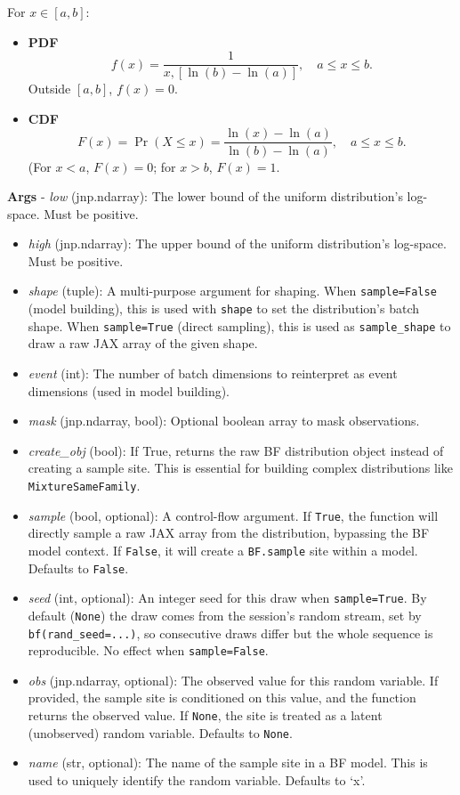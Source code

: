 \documentclass[
  letterpaper,
  DIV=11,
  numbers=noendperiod]{scrartcl}
\begin{document}
For \(x \in [a, b]\):

\begin{itemize}
\item
  \textbf{PDF} \[
  f(x) = \frac{1}{x , [\ln(b) - \ln(a)]}, \quad a \le x \le b.
  \] Outside \([a, b]\), \(f(x) = 0\).
\item
  \textbf{CDF} \[
  F(x) = \Pr(X \le x) = \frac{\ln(x) - \ln(a)}{\ln(b) - \ln(a)}, \quad a \le x \le b.
  \] (For \(x < a\), \(F(x) = 0\); for \(x > b\), \(F(x) = 1\).
\end{itemize}

\textbf{Args} - \emph{low} (jnp.ndarray): The lower bound of the uniform
distribution's log-space. Must be positive.

\begin{itemize}
\item
  \emph{high} (jnp.ndarray): The upper bound of the uniform
  distribution's log-space. Must be positive.
\item
  \emph{shape} (tuple): A multi-purpose argument for shaping. When
  \texttt{sample=False} (model building), this is used with
  \texttt{shape} to set the distribution's batch shape. When
  \texttt{sample=True} (direct sampling), this is used as
  \texttt{sample\_shape} to draw a raw JAX array of the given shape.
\item
  \emph{event} (int): The number of batch dimensions to reinterpret as
  event dimensions (used in model building).
\item
  \emph{mask} (jnp.ndarray, bool): Optional boolean array to mask
  observations.
\item
  \emph{create\_obj} (bool): If True, returns the raw BF distribution
  object instead of creating a sample site. This is essential for
  building complex distributions like \texttt{MixtureSameFamily}.
\item
  \emph{sample} (bool, optional): A control-flow argument. If
  \texttt{True}, the function will directly sample a raw JAX array from
  the distribution, bypassing the BF model context. If \texttt{False},
  it will create a \texttt{BF.sample} site within a model. Defaults to
  \texttt{False}.
\item
  \emph{seed} (int, optional): An integer seed for this draw when
  \texttt{sample=True}. By default (\texttt{None}) the draw comes from
  the session's random stream, set by \texttt{bf(rand\_seed=...)}, so
  consecutive draws differ but the whole sequence is reproducible. No
  effect when \texttt{sample=False}.
\item
  \emph{obs} (jnp.ndarray, optional): The observed value for this random
  variable. If provided, the sample site is conditioned on this value,
  and the function returns the observed value. If \texttt{None}, the
  site is treated as a latent (unobserved) random variable. Defaults to
  \texttt{None}.
\item
  \emph{name} (str, optional): The name of the sample site in a BF
  model. This is used to uniquely identify the random variable. Defaults
  to `x'.
\end{itemize}
\end{document}
